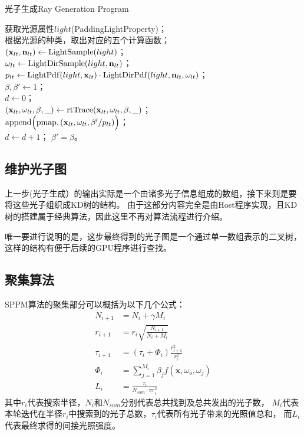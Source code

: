 \begin{algorithm}
    \caption{光子生成Ray Generation Program}
    \label{RGPPPass}

    获取光源属性$light$(PaddingLightProperty)；\\
    根据光源的种类，取出对应的五个计算函数；\\
    $(\textbf{x}_{lt}, \textbf{n}_{lt}) \leftarrow {\rm LightSample}(light)$； \\
    $\omega_{lt} \leftarrow {\rm LightDirSample}(light, \textbf{n}_{lt})$； \\
    $p_{lt} \leftarrow {\rm LightPdf}(light, \textbf{x}_{lt})\cdot {\rm LightDirPdf}(light, \textbf{n}_{lt}, \omega_{lt})$； \\
    $\beta, \beta' \leftarrow 1$；\\    
    $d \leftarrow 0$；\\
    {
        $(\textbf{x}_{lt}, \omega_{lt}, \beta, \_) \leftarrow {\rm rtTrace}(\textbf{x}_{lt}, \omega_{lt}, \beta, \_)$；\\
        {    
            ${\rm append}\Big({\rm pmap}, (\textbf{x}_{lt}, \omega_{lt}, \beta' / p_{lt})\Big)$；\\
            $d \leftarrow d+1$；
        }
        $\beta' = \beta$。
    }

\end{algorithm}

\subsection{维护光子图}
上一步(光子生成）的输出实际是一个由诸多光子信息组成的数组，接下来则是要将这些光子组织成KD树的结构。
由于这部分内容完全是由Host程序实现，且KD树的搭建属于经典算法，因此这里不再对算法流程进行介绍。

唯一要进行说明的是，这步最终得到的光子图是一个通过单一数组表示的二叉树，
这样的结构有便于后续的GPU程序进行查找。

\subsection{聚集算法}

SPPM算法的聚集部分可以概括为以下几个公式：
\begin{align}
    N_{i+1} &= N_{i}+\gamma M_i \label{SPPM1}\\
    r_{i+1} &= r_i\sqrt{\frac{N_{i+1}}{N_i+M_i}} \label{SPPM2}\\
    \tau_{i+1} &= (\tau_i+\Phi_i)\frac{r_{i+1}^2}{r_i^2} \label{SPPM3}\\
    \Phi_i &= \sum_{j = 1}^{M_i}\beta_jf(\textbf{x},\omega_o, \omega_j) \\
    L_i &= \frac{\tau_i}{N_{sum}\cdot \pi r_i^2}  
\end{align}
其中$r_i$代表搜索半径，$N_i$和$N_{sum}$分别代表总共找到及总共发出的光子数，
$M_i$代表本轮迭代在半径$r_i$中搜索到的光子总数，$\tau_i$代表所有光子带来的光照值总和，
而$L_i$代表最终求得的间接光照强度。

